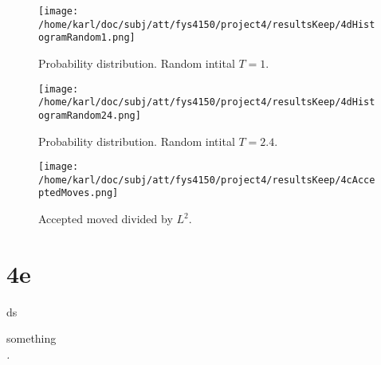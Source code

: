 \documentclass{article}
\begin{document}
\begin{minipage}{.45\textwidth} 
	\begin{figure}[H]
		\centering
		\texttt{[image: /home/karl/doc/subj/att/fys4150/project4/resultsKeep/4dHistogramRandom1.png]}
		\caption{Probability distribution. Random intital $T = 1$. \\ \textit{}}
		\label{1}
	\end{figure}
\end{minipage}\hfill
\begin{minipage}{.45\textwidth} 
	\begin{figure}[H]
		\centering
		\texttt{[image: /home/karl/doc/subj/att/fys4150/project4/resultsKeep/4dHistogramRandom24.png]}
		\caption{Probability distribution. Random intital $T = 2.4$.  \\ \textit{}}
		\label{1}
	\end{figure}
\end{minipage}\hfill
\vspace{2ex}

\begin{figure}[H]
	\centering
	\texttt{[image: /home/karl/doc/subj/att/fys4150/project4/resultsKeep/4cAcceptedMoves.png]}
	\caption{Accepted moved divided by $L^2$. \\ \textit{}}
	\label{1}
\end{figure}

\section{4e}
ds

\begin{table}[H]
	\centering
	\begin{adjustbox}{width=.5\textwidth}
	\end{adjustbox}
	\caption{something \\ \textit{.}}
	\label{1}
\end{table}
\end{document}
